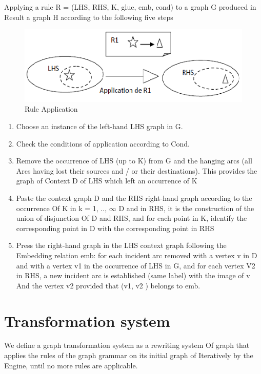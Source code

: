 Applying a rule R = (LHS, RHS, K, glue, emb, cond) to a graph G produced in
Result a graph H according to the following five steps

\begin{figure}[th]
	\centering
		\includegraphics[scale=0.9]{ch3/img/rules}
	\caption{\label{fig:Rule Application}Rule Application\cite{ch3-img}}
\end{figure} 

\begin{enumerate}
\item  Choose an instance of the left-hand LHS graph in G.
\item Check the conditions of application according to Cond.
\item Remove the occurrence of LHS (up to K) from G and the hanging arcs (all
Arcs having lost their sources and / or their destinations). This provides the graph of
Context D of LHS which left an occurrence of K
\item
Paste the context graph D and the RHS right-hand graph according to the occurrence
Of K in k = 1, .., $\infty$ D and in RHS, it is the construction of the union of disjunction
Of D and RHS, and for each point in K, identify the corresponding point in
D with the corresponding point in RHS
\item
Press the right-hand graph in the LHS context graph following the
Embedding relation emb: for each incident arc removed with a vertex v in
D and with a vertex v1 in the occurrence of LHS in G, and for each vertex
V2 in RHS, a new incident arc is established (same label) with the image of v
And the vertex v2 provided that (v1, v2 ) belongs to emb. 
\end{enumerate}


 
\section{Transformation system} 

We define a graph transformation system as a rewriting system
Of graph that applies the rules of the graph grammar on its initial graph of
Iteratively by the Engine, until no more rules are applicable\cite{ch3-doc2,  ch3-doc}.


